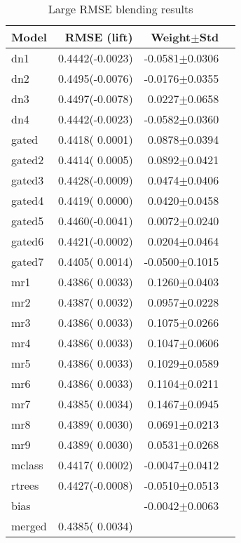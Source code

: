\documentclass{article}
\begin{document}
\begin{table}[t]
\caption{Large RMSE blending results}
\label{problems}
\vskip 0.15in
\begin{center}
\begin{small}
\begin{sc}
\begin{tabular}{lrrr}
\hline
\abovespace\belowspace
Model & RMSE (lift) & Weight$\pm$Std \\
\hline
\abovespace
dn1        & 0.4442(-0.0023) & -0.0581$\pm$0.0306 \\
dn2        & 0.4495(-0.0076) & -0.0176$\pm$0.0355 \\
dn3        & 0.4497(-0.0078) &  0.0227$\pm$0.0658 \\
dn4        & 0.4442(-0.0023) & -0.0582$\pm$0.0360 \\
\abovespace
gated      & 0.4418( 0.0001) &  0.0878$\pm$0.0394 \\
gated2     & 0.4414( 0.0005) &  0.0892$\pm$0.0421 \\
gated3     & 0.4428(-0.0009) &  0.0474$\pm$0.0406 \\
gated4     & 0.4419( 0.0000) &  0.0420$\pm$0.0458 \\
gated5     & 0.4460(-0.0041) &  0.0072$\pm$0.0240 \\
gated6     & 0.4421(-0.0002) &  0.0204$\pm$0.0464 \\
gated7     & 0.4405( 0.0014) & -0.0500$\pm$0.1015 \\
\abovespace
mr1        & 0.4386( 0.0033) &  0.1260$\pm$0.0403 \\
mr2        & 0.4387( 0.0032) &  0.0957$\pm$0.0228 \\
mr3        & 0.4386( 0.0033) &  0.1075$\pm$0.0266 \\
mr4        & 0.4386( 0.0033) &  0.1047$\pm$0.0606 \\
mr5        & 0.4386( 0.0033) &  0.1029$\pm$0.0589 \\
mr6        & 0.4386( 0.0033) &  0.1104$\pm$0.0211 \\
mr7        & 0.4385( 0.0034) &  0.1467$\pm$0.0945 \\
mr8        & 0.4389( 0.0030) &  0.0691$\pm$0.0213 \\
mr9        & 0.4389( 0.0030) &  0.0531$\pm$0.0268 \\
\abovespace
mclass     & 0.4417( 0.0002) & -0.0047$\pm$0.0412 \\
rtrees     & 0.4427(-0.0008) & -0.0510$\pm$0.0513 \\
\abovespace
bias       &                 & -0.0042$\pm$0.0063 \\
\abovespace\belowspace
merged     & 0.4385( 0.0034) &                    \\
\hline
\end{tabular}
\end{sc}
\end{small}
\end{center}
\vskip -0.1in
\end{table}
\end{document}
